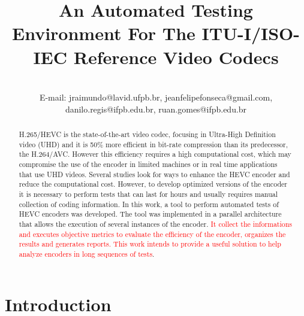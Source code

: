 \documentclass[journal]{IEEEtran}
\begin{document}
\title{An Automated Testing Environment For The ITU-I/ISO-IEC Reference Video Codecs}

\author{
							
\\E-mail:  jraimundo@lavid.ufpb.br, jeanfelipefonseca@gmail.com, danilo.regis@ifpb.edu.br, ruan.gomes@ifpb.edu.br
}


\maketitle
\begin{abstract}

H.265/HEVC is the state-of-the-art video codec, focusing in Ultra-High Definition video (UHD) and it is 50\% more efficient in bit-rate compression than its predecessor, the H.264/AVC. However this efficiency requires a high computational cost, which may compromise the use of the encoder in limited machines or in real time applications that use UHD videos. Several studies look for ways to enhance the HEVC encoder and reduce the computational cost. However, to develop optimized versions of the encoder it is necessary to perform tests that can last for hours and usually requires manual collection of coding information.  In this work, a tool to perform automated tests of HEVC encoders  was developed. The tool was implemented in a parallel architecture that allows the execution of several instances of the encoder. \textcolor{red}{It collect the informations and executes objective metrics to evaluate the efficiency of the encoder, organizes the results and generates reports. This work intends to provide a useful solution to help analyze encoders in long sequences of tests}.

\end{abstract}


\section{Introduction}
\end{document}
